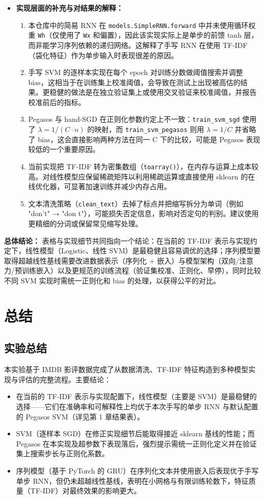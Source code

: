 \begin{itemize}
    \item {\bf 实现层面的补充与对结果的解释：}
    \begin{enumerate}
        \item 本仓库中的简易 RNN 在 \texttt{models.SimpleRNN.forward} 中并未使用循环权重 \texttt{Wh}（仅使用了 \texttt{Wx} 和偏置），因此该实现实际上是单步的前馈 tanh 层，而非能学习序列依赖的递归网络。这解释了手写 RNN 在使用 TF-IDF（袋化特征）作为单步输入时表现很差的原因。
        \item 手写 SVM 的逐样本实现在每个 epoch 对训练分数做阈值搜索并调整 bias，这相当于在训练集上校准阈值，会导致在测试上出现被高估的结果。更稳健的做法是在独立验证集上或使用交叉验证来校准阈值，并报告校准前后的指标。
        \item Pegasos 与 hand-SGD 在正则化参数约定上不一致：\texttt{train\_svm\_sgd} 使用了 $\lambda=1/(C\cdot n)$ 的映射，而 \texttt{train\_svm\_pegasos} 则用 $\lambda=1/C$ 并省略了 bias，这会直接影响两种方法在同一 C 下的比较，可能是 Pegasos 表现较低的一个重要原因。
        \item 当前实现把 TF-IDF 转为密集数组（\texttt{toarray()}），在内存与运算上成本较高。对线性模型应保留稀疏矩阵以利用稀疏运算或直接使用 sklearn 的在线优化器，可显著加速训练并减少内存占用。
        \item 文本清洗策略（\texttt{clean\_text}）去掉了标点并把缩写拆分为单词（例如 "don't" → "don t"），可能损失否定信息，影响对否定句的判别。建议使用更精细的分词或保留常见缩写处理。
    \end{enumerate}
\end{itemize}

\textbf{总体结论：}
表格与实现细节共同指向一个结论：在当前的 TF-IDF 表示与实现约定下，线性模型（Logistic、线性 SVM）是最稳健且容易调优的选择；序列模型要取得超越线性基线需要改进数据表示（序列化 + 嵌入）与模型架构（双向/注意力/预训练嵌入）以及更规范的训练流程（验证集校准、正则化、早停），同时比较不同 SVM 实现时需统一正则化和 bias 的处理，以获得公平的对比。

\chapter{总结}

\section{实验总结}
本实验基于 IMDB 影评数据完成了从数据清洗、TF-IDF 特征构造到多种模型实现与评估的完整流程。主要结论：
\begin{itemize}
    \item 在当前的 TF-IDF 表示与实现配置下，线性模型（主要是 SVM）是最稳健的选择——它们在准确率和可解释性上均优于本次手写的单步 RNN 与默认配置的 Pegasos SVM（详见第 1 章结果表）。
    \item SVM（逐样本 SGD）在修正实现细节后能取得接近 sklearn 基线的性能；而 Pegasos 在本实现及超参数下表现落后，强烈提示需统一正则化定义并在验证集上搜索步长与正则化系数。
    \item 序列模型（基于 PyTorch 的 GRU）在序列化文本并使用嵌入后表现优于手写单步 RNN，但仍未超越线性基线，表明在小网格与有限训练轮数下，特征质量（TF-IDF）对最终效果的影响更大。
\end{itemize}

